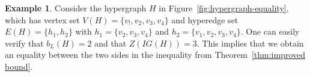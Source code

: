 \documentclass[12pt]{article}
\theoremstyle{plain}
\theoremstyle{definition}
\newtheorem{example}[theorem]{Example}
\theoremstyle{remark}
\begin{document}
\begin{example}
    Consider the hypergraph $H$ in Figure~\ref{fig:hypergraph-equality}, which has vertex set $V(H)=\{v_!,v_2,v_3,v_4\}$ and hyperedge set $E(H)=\{h_1,h_2\}$ with $h_1=\{v_2,v_3,v_4\}$ and $h_2=\{v_1,v_2,v_3,v_4\}$.
    One can easily verify that $b_L(H)=2$ and that $Z(IG(H))=3$.
    This implies that we obtain an equality between the two sides in the inequality from Theorem~\ref{thm:improved bound}.
    \label{example:more-than-one-hyperedge-equality}
\end{example}
\vspace{-0.5cm}

\begin{figure}[htp!]
    \centering    
    


\begin{tikzpicture}[x=0.75pt,y=0.75pt,yscale=-1,xscale=1]


\end{tikzpicture}
\end{figure}
\end{document}
